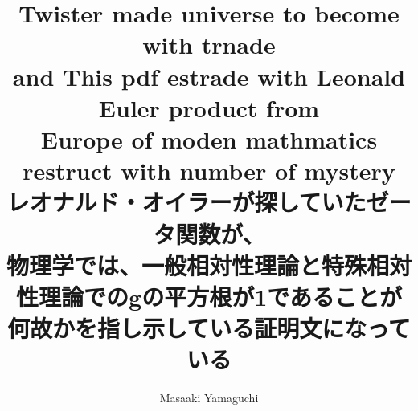 \documentclass{jsarticle}
\begin{document}
\title{Twister made universe to become with trnade \\
and This pdf estrade with Leonald Euler product from \\
Europe of moden mathmatics restruct with number of mystery \\
レオナルド・オイラーが探していたゼータ関数が、\\
物理学では、一般相対性理論と特殊相対性理論でのgの平方根が1であることが \\
何故かを指し示している証明文になっている}
\author{Masaaki Yamaguchi}
\date{}
\maketitle
   \newcommand{\variint}{%
	\begin{picture}(15,30)
		\put(0,0){
			$ \iint $}
		\put(0,5){\line(15,0){15}}
	\end{picture} %
}

\newcommand{\variiint}{%
	\begin{picture}(15,15)
	\put(0,0){
			$ \iiint $}
		\put(0,5){\line(15,0){20}}
	\end{picture} %
}



 \newcommand{\alearletter}{%
	 \begin{picture}(10,20)
		 \put(0,0){
			 $ \square $}
		 \put(0,0){\line(1,1){10}}
	 \end{picture} %
	 }

 \newcommand{\secproduct}{%
	 \begin{picture}(10,20)
		 \put(0,0){
			 $ \nabla $}
		 \put(5,0){+}
	 \end{picture} %
	 }
 \newcommand{\talot}{%
	 \begin{picture}(15,20)
		 \put(0,0){
			 $ \text{\scalebox{2.0}[2]{$\nabla$}}$}
		 \put(5,3){
			 $ \Delta $}
	 \end{picture} %
	 }
 \newcommand{\hazerdnabla}{%
	 \begin{picture}(15,20)
		 \put(0,0){
			 $ \text{\scalebox{2.0}[2]{$\nabla$}}$}
		 \put(5,3){
			 $\text{Y}  $}
	 \end{picture} %
	 }

 \newcommand{\securebox}{%
	 \begin{picture}(15,20)
		 \put(0,0){
			 $ \text{\scalebox{2.0}[2]{$\square$}}$}
		 \put(5,3){
			 $\text{Y}  $}
	 \end{picture} %
	 }


\newcommand{\timebow}{%
	\begin{picture}(5,5)
		\put(0,0){$\text{\rotatebox{90}{$\bowtie$}}$}
	\end{picture} %
	}
\end{document}
